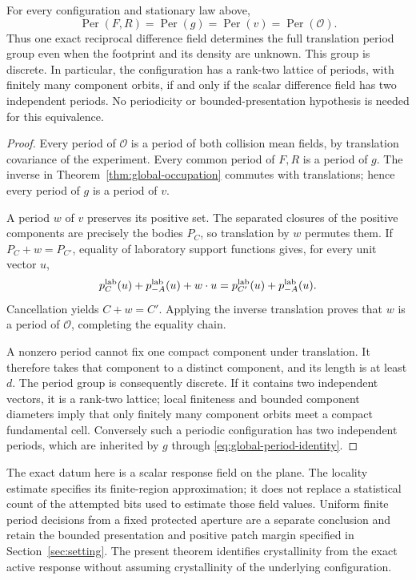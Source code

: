 \begin{theorem}
\label{thm:global-response-rigidity}
For every configuration and stationary law above,
\begin{equation}\label{eq:global-period-identity}
 \operatorname{Per}(F,R)=\operatorname{Per}(g)
      =\operatorname{Per}(v)=\operatorname{Per}(\mathcal O).
\end{equation}
Thus one exact reciprocal difference field determines the full
translation period group even when the footprint and its density are
unknown. This group is discrete. In particular, the configuration has
a rank-two lattice of periods, with finitely many component orbits,
if and only if the scalar difference field has two independent periods.
No periodicity or bounded-presentation hypothesis is needed for this
equivalence.
\end{theorem}
\begin{proof}
Every period of $\mathcal O$ is a period of both collision mean
fields, by translation covariance of the experiment. Every common
period of $F,R$ is a period of $g$. The inverse in
Theorem~\ref{thm:global-occupation} commutes with translations; hence
every period of $g$ is a period of $v$.

A period $w$ of $v$ preserves its positive set. The separated closures
of the positive components are precisely the bodies $P_C$, so
translation by $w$ permutes them. If $P_C+w=P_{C'}$, equality of
laboratory support functions gives, for every unit vector $u$,
\[
 p_C^{\rm lab}(u)+p_{-A}^{\rm lab}(u)+w\cdot u
       =p_{C'}^{\rm lab}(u)+p_{-A}^{\rm lab}(u).
\]
Cancellation yields $C+w=C'$. Applying the inverse translation proves
that $w$ is a period of $\mathcal O$, completing the equality chain.

A nonzero period cannot fix one compact component under translation.
It therefore takes that component to a distinct component, and its
length is at least $d$. The period group is consequently discrete.
If it contains two independent vectors, it is a rank-two lattice;
local finiteness and bounded component diameters imply that only
finitely many component orbits meet a compact fundamental cell.
Conversely such a periodic configuration has two independent periods,
which are inherited by $g$ through \eqref{eq:global-period-identity}.
\end{proof}

The exact datum here is a scalar response field on the plane. The
locality estimate specifies its finite-region approximation; it does
not replace a statistical count of the attempted bits used to estimate
those field values. Uniform finite period decisions from a fixed
protected aperture are a separate conclusion and retain the bounded
presentation and positive patch margin specified in
Section~\ref{sec:setting}. The present theorem identifies crystallinity
from the exact active response without assuming crystallinity of the
underlying configuration.

